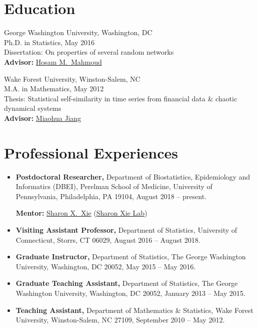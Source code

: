 \documentclass{res}
\begin{document}
\begin{resume} 
	
\section{Education} 
George Washington University, Washington, DC \\
Ph.D. in Statistics, May 2016 \\
Dissertation: On properties of several random networks \\
{\bf Advisor:} 
\href{https://statistics.columbian.gwu.edu/hosam-m-mahmoud}
{Hosam M.\ Mahmoud}

Wake Forest University, Winston-Salem, NC \\
M.A. in Mathematics, May 2012 \\
Thesis: Statistical self-similarity in time series from financial 
data \& chaotic dynamical systems \\
{\bf Advisor:} \href{https://math.wfu.edu/jiang}{Miaohua Jiang}

\section{Professional Experiences}
\begin{itemize}
	\item {\bf Postdoctoral Researcher,} Department of 
	Biostatistics, Epidemiology and Informatics (DBEI), Perelman 
	School of Medicine, University of Pennsylvania, Philadelphia, PA 
	19104, 
	August 2018 -- present.
	
	{\bf Mentor:} 
	\href{https://www.med.upenn.edu/apps/faculty/index.php/g275/
		p9964}{Sharon X.\ Xie} 
		(\href{https://sites.google.com/view/sharonxielab/
		home?authuser=0}{Sharon Xie Lab})
	
	\item {\bf Visiting Assistant Professor,} Department of 
	Statistics, University of Connecticut, Storrs, CT 06029, August 
	2016 
	-- August 2018.
	
	\item {\bf Graduate Instructor,} Department of Statistics, The 
	George Washington University, Washington, DC 20052, May 2015 -- 
	May 
	2016.
	
	\item{\bf Graduate Teaching Assistant,} Department of 
	Statistics, The George Washington University, Washington, DC 
	20052, 
	January 2013 -- May 2015.
	
	\item{\bf Teaching Assistant,} Department of Mathematics \& 
	Statistics, Wake Forest University, Winston-Salem, NC 27109, 
	September 
	2010 -- May 2012.
\end{itemize}


\end{resume}
\end{document}
